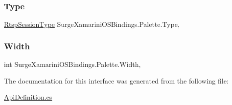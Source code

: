 \subsubsection{\texorpdfstring{Type}{Type}}
{\footnotesize\ttfamily \hyperlink{namespace_surge_xamarini_o_s_bindings_ae265f95a36d7f788d0c279a0cd2da6c1}{Rtsp\+Session\+Type} Surge\+Xamarini\+O\+S\+Bindings.\+Palette.\+Type\hspace{0.3cm}{\ttfamily [get]}, {\ttfamily [set]}}

\mbox{\label{interface_surge_xamarini_o_s_bindings_1_1_palette_a57aa40e8416635079e19e808507c1340}} 
\subsubsection{\texorpdfstring{Width}{Width}}
{\footnotesize\ttfamily int Surge\+Xamarini\+O\+S\+Bindings.\+Palette.\+Width\hspace{0.3cm}{\ttfamily [get]}, {\ttfamily [set]}}



The documentation for this interface was generated from the following file\+:\begin{DoxyCompactItemize}
\item 
\hyperlink{_api_definition_8cs}{Api\+Definition.\+cs}\end{DoxyCompactItemize}
